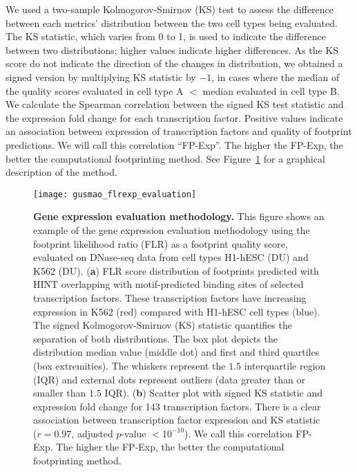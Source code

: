We used a two-sample Kolmogorov-Smirnov (KS) test to assess the difference between each metrics' distribution between the two cell types being evaluated. The KS statistic, which varies from 0 to 1, is used to indicate the difference between two distributions; higher values indicate higher differences. As the KS score do not indicate the direction of the changes in distribution, we obtained a signed version by multiplying KS statistic by $-1$, in cases where the median of the quality scores evaluated in cell type A $<$ median evaluated in cell type B. We calculate the Spearman correlation between the signed KS test statistic and the expression fold change for each transcription factor. Positive values indicate an association between expression of transcription factors and quality of footprint predictions. We will call this correlation ``FP-Exp''. The higher the FP-Exp, the better the computational footprinting method. See Figure~\ref{fig:gusmao_flrexp_evaluation} for a graphical description of the method.

\begin{figure}[h!]
\centering
\texttt{[image: gusmao\_flrexp\_evaluation]}
\caption[Gene expression evaluation methodology]{\textbf{Gene expression evaluation methodology.} This figure shows an example of the gene expression evaluation methodology using the footprint likelihood ratio (FLR) as a footprint quality score, evaluated on DNase-seq data from cell types H1-hESC (DU) and K562 (DU). (\textbf{a}) FLR score distribution of footprints predicted with HINT overlapping with motif-predicted binding sites of selected transcription factors. These transcription factors have increasing expression in K562 (red) compared with H1-hESC cell types (blue). The signed Kolmogorov-Smirnov (KS) statistic quantifies the separation of both distributions. The box plot depicts the distribution median value (middle dot) and first and third quartiles (box extremities). The whiskers represent the $1.5$ interquartile region (IQR) and external dots represent outliers (data greater than or smaller than $1.5$ IQR). (\textbf{b}) Scatter plot with signed KS statistic and expression fold change for 143 transcription factors. There is a clear association between transcription factor expression and KS statistic ($r = 0.97$, adjusted $p$-value $< 10^{-10}$). We call this correlation FP-Exp. The higher the FP-Exp, the better the computational footprinting method.}
\label{fig:gusmao_flrexp_evaluation}
\end{figure}

